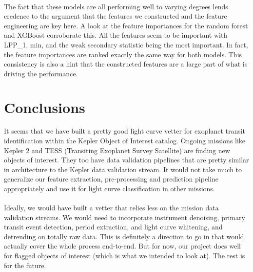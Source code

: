\documentclass{article}
\begin{document}
\paragraph{} The fact that these models are all performing well to varying degrees lends credence to the argument that the features we constructed and the feature engineering are key here. A look at the feature importances for the random forest and XGBoost corroborate this. All the features seem to be important with LPP\_1, min, and the weak secondary statistic being the most important. In fact, the feature importances are ranked exactly the same way for both models. This consistency is also a hint that the constructed features are a large part of what is driving the performance.
\section{Conclusions}
\paragraph{} It seems that we have built a pretty good light curve vetter for exoplanet transit identification within the Kepler Object of Interest catalog. Ongoing missions like Kepler 2 and TESS (Transiting Exoplanet Survey Satellite) are finding new objects of interest. They too have data validation pipelines that are pretty similar in architecture to the Kepler data validation stream. It would not take much to generalize our feature extraction, pre-processing and prediction pipeline appropriately and use it for light curve classification in other missions. 
\paragraph{} Ideally, we would have built a vetter that relies less on the mission data validation streams. We would need to incorporate instrument denoising, primary transit event detection, period extraction, and light curve whitening, and detrending on totally raw data. This is definitely a direction to go in that would actually cover the whole process end-to-end. But for now, our project does well for flagged objects of interest (which is what we intended to look at). The rest is for the future.
\end{document}
